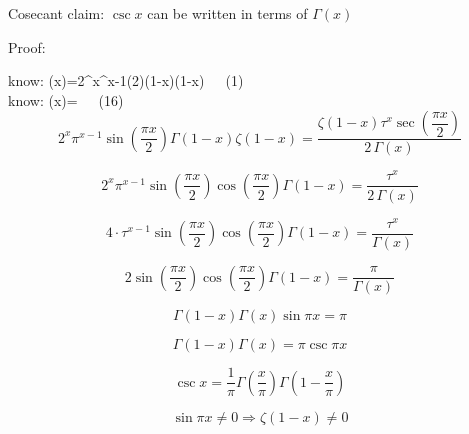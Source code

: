 \documentclass[12pt]{article}
\begin{document}
\pagebreak\begin{section}{Cosecant}
	claim: $\csc x$ can be written in terms of $\Gamma(x)$

	\noindent Proof:

	\noindent know: \zeta(x)=2^x\pi^{x-1}\sin\left(2\right)\Gamma(1-x)\zeta(1-x)~~~(1)\\
	
	\noindent know: \zeta(x)=~~~(16)\\

	\begin{equation}
		2^x\pi^{x-1}\sin\left(\dfrac{\pi x}2\right)\Gamma(1-x)\zeta(1-x)=\dfrac{\zeta(1-x)\tau^x\sec\left(\dfrac{\pi x}2\right)}{2\,\Gamma(x)}
	\end{equation}

	\begin{equation}
		2^x\pi^{x-1}\sin\left(\dfrac{\pi x}2\right)\cos\left(\dfrac{\pi x}2\right)\Gamma(1-x)=\dfrac{\tau^x}{2\,\Gamma(x)}
	\end{equation}

	\begin{equation}
		4\cdot\tau^{x-1}\sin\left(\dfrac{\pi x}2\right)\cos\left(\dfrac{\pi x}2\right)\Gamma(1-x)=\dfrac{\tau^x}{\Gamma(x)}
	\end{equation}

	\begin{equation}
		2\sin\left(\dfrac{\pi x}2\right)\cos\left(\dfrac{\pi x}2\right)\Gamma(1-x)=\dfrac{\pi}{\Gamma(x)}
	\end{equation}

	\begin{equation}
		\Gamma(1-x)\Gamma(x)\sin\pi x=\pi
	\end{equation}

	\begin{equation}
		\Gamma(1-x)\Gamma(x)=\pi\csc\pi x
	\end{equation}

	\begin{equation}
		\csc x=\dfrac1\pi\Gamma\left(\dfrac x\pi\right)\Gamma\left(1-\dfrac x\pi\right)
	\end{equation}

	\begin{equation}
		\sin\pi x\ne0\Longrightarrow\zeta(1-x)\ne0
	\end{equation}


	\noindent\blacksquare
\end{section}
\end{document}
